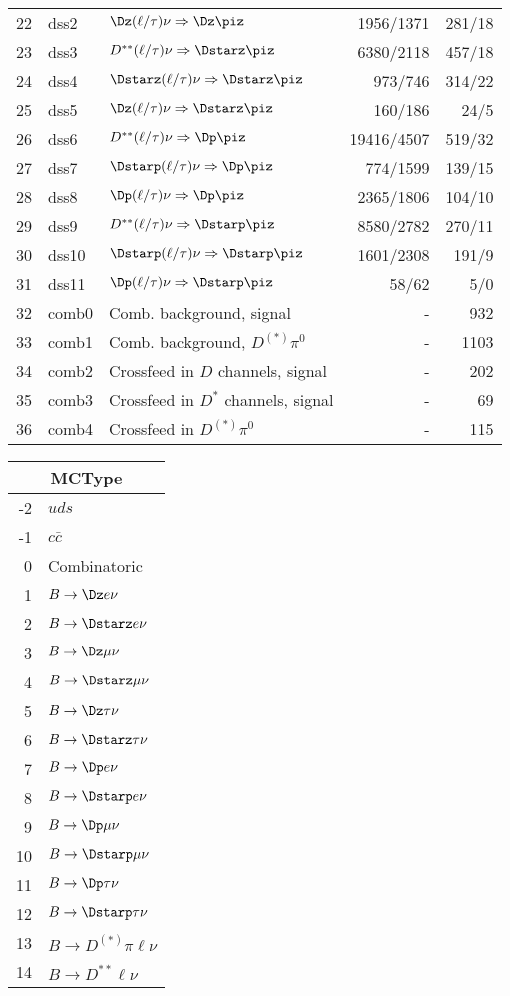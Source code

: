 \documentclass[6pt]{article}
\begin{document}
\begin{tabular}{r l l r r}
22 & dss2  & $\Dz(\ell/\tau)\nu\Rightarrow\Dz\piz$   &  1956/1371  &  281/18  \\
23 & dss3  & $D^{**}(\ell/\tau)\nu\Rightarrow\Dstarz\piz$   &  6380/2118  &  457/18  \\
24 & dss4  & $\Dstarz(\ell/\tau)\nu\Rightarrow\Dstarz\piz$   &  973/746  &  314/22  \\
25 & dss5  & $\Dz(\ell/\tau)\nu\Rightarrow\Dstarz\piz$   & 160/186   &  24/5  \\
26 & dss6  & $D^{**}(\ell/\tau)\nu\Rightarrow\Dp\piz$   & 19416/4507   &  519/32  \\
27 & dss7  & $\Dstarp(\ell/\tau)\nu\Rightarrow\Dp\piz$   & 774/1599   &  139/15  \\
28 & dss8  & $\Dp(\ell/\tau)\nu\Rightarrow\Dp\piz$   & 2365/1806   & 104/10   \\
29 & dss9  & $D^{**}(\ell/\tau)\nu\Rightarrow\Dstarp\piz$   & 8580/2782   & 270/11   \\
30 & dss10 & $\Dstarp(\ell/\tau)\nu\Rightarrow\Dstarp\piz$   & 1601/2308   &  191/9  \\
31 & dss11 & $\Dp(\ell/\tau)\nu\Rightarrow\Dstarp\piz$   & 58/62   &  5/0  \\\hline
32 & comb0       & Comb. background, signal   & -   &  932  \\
33 & comb1       & Comb. background, $D^{(*)}\pi^0$    &  -  &  1103  \\
34 & comb2       & Crossfeed in $D$ channels, signal    &  -  &  202  \\
35 & comb3       & Crossfeed in $D^*$ channels, signal    &  -  &  69  \\
36 & comb4       & Crossfeed in $D^{(*)}\pi^0$    &  -  &  115  \\ \hline\hline
\end{tabular}

\begin{tabular}{r l}\\ \hline\hline
\multicolumn{2}{c}{\bf MCType}\\ \hline
-2 & $uds$\\
-1 & $c\bar{c}$\\
0 & Combinatoric\\
1 & $B\to\Dz e\nu$\\
2 & $B\to\Dstarz e\nu$\\
3 & $B\to\Dz\mu\nu$\\
4 & $B\to\Dstarz\mu\nu$\\
5 & $B\to\Dz\tau\nu$\\
6 & $B\to\Dstarz\tau\nu$\\
7 & $B\to\Dp e\nu$\\
8 & $B\to\Dstarp e\nu$\\
9 & $B\to\Dp\mu\nu$\\
10 & $B\to\Dstarp\mu\nu$\\
11 & $B\to\Dp\tau\nu$\\
12 & $B\to\Dstarp\tau\nu$\\
13 & $B\to D^{(*)}\pi\ell\nu$\\
14 & $B\to D^{**}\ell\nu$\\ \hline\hline
\end{tabular}
\end{document}
